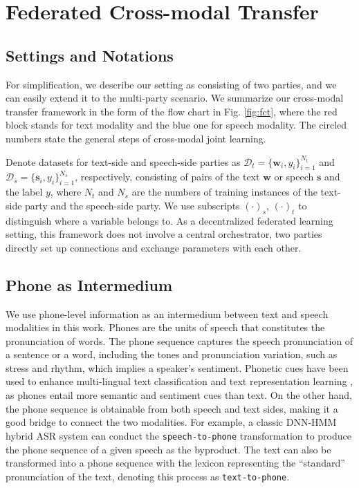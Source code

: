 \documentclass[11pt]{article}
\begin{document}
\section{Federated Cross-modal Transfer}


\subsection{Settings and Notations}
\label{sec:settings and notations}

For simplification, we describe our setting as consisting of two parties, and we can easily extend it to the multi-party scenario. We summarize our cross-modal transfer framework in the form of the flow chart in Fig. \ref{fig:fct}, where the red block stands for text modality and the blue one for speech modality. The circled numbers state the general steps of cross-modal joint learning.

Denote datasets for text-side and speech-side parties as $\mathcal{D}_t=\{\mathbf{w}_i,y_i\}_{i=1}^{N_t}$ and $\mathcal{D}_s=\{\mathbf{s}_i,y_i\}_{i=1}^{N_s}$, respectively, consisting of pairs of the text $\mathbf{w}$ or speech $\mathbf{s}$ and the label $y$, where $N_t$ and $N_s$ are the numbers of training instances of the text-side party and the speech-side party. We use subscripts $(\cdot)_{s}$, $(\cdot)_{t}$ to distinguish where a variable belongs to. As a decentralized federated learning setting, this framework does not involve a central orchestrator, two parties directly set up connections and exchange parameters with each other.

\subsection{Phone as Intermedium}
We use phone-level information as an intermedium between text and speech modalities in this work. Phones are the units of speech that constitutes the pronunciation of words. The phone sequence captures the speech pronunciation of a sentence or a word, including the tones and pronunciation variation, such as stress and rhythm, which implies a speaker's sentiment. Phonetic cues have been used to enhance multi-lingual text classification \cite{Xueyang-singh2021classification} and text representation learning \cite{Xueyang-peng2021phonetic}, as phones entail more semantic and sentiment cues than text. On the other hand, the phone sequence is obtainable from both speech and text sides, making it a good bridge to connect the two modalities. For example, a classic DNN-HMM hybrid ASR system can conduct the \texttt{speech-to-phone} transformation to produce the phone sequence of a given speech as the byproduct. The text can also be transformed into a phone sequence with the lexicon representing the ``standard'' pronunciation of the text, denoting this process as \texttt{text-to-phone}.
\end{document}
